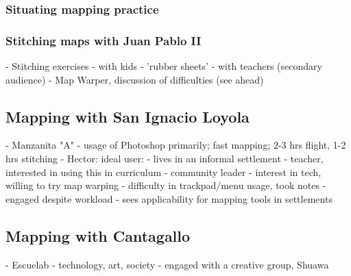\documentclass[11pt]{report}
\begin{document}
\subsubsection{Situating mapping practice}


\subsubsection{Stitching maps with Juan Pablo II}
                - Stitching exercises
                    - with kids - 'rubber sheets'
                        - with teachers (secondary audience) - Map Warper, discussion of difficulties (see ahead)

\subsection{Mapping with San Ignacio Loyola}
            - Manzanita "A"
            - usage of Photoshop primarily; fast mapping; 2-3 hrs flight, 1-2 hrs stitching
            - Hector: ideal user: 
                - lives in an informal settlement
                - teacher, interested in using this in curriculum
                - community leader
                - interest in tech, willing to try map warping
                    - difficulty in trackpad/menu usage, took notes
                - engaged despite workload
                - sees applicability for mapping tools in settlements

\subsection{Mapping with Cantagallo}
            - Escuelab - technology, art, society
            - engaged with a creative group, Shuawa
\end{document}
